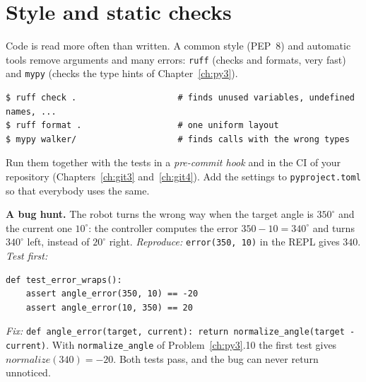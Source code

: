 \section*{Style and static checks}
Code is read more often than written. A common style (PEP~8) and automatic tools remove arguments and many errors: \texttt{ruff} (checks and formats, very fast) and \texttt{mypy} (checks the type hints of Chapter~\ref{ch:py3}).
\begin{verbatim}
$ ruff check .                    # finds unused variables, undefined names, ...
$ ruff format .                   # one uniform layout
$ mypy walker/                    # finds calls with the wrong types
\end{verbatim}
Run them together with the tests in a \emph{pre-commit hook} and in the CI of your repository (Chapters~\ref{ch:git3} and~\ref{ch:git4}). Add the settings to \texttt{pyproject.toml} so that everybody uses the same.

\begin{example}
\textbf{A bug hunt.} The robot turns the wrong way when the target angle is $350^\circ$ and the current one $10^\circ$: the controller computes the error $350-10=340^\circ$ and turns $340^\circ$ left, instead of $20^\circ$ right. \emph{Reproduce:} \texttt{error(350, 10)} in the REPL gives $340$. \emph{Test first:}
\begin{verbatim}
def test_error_wraps():
    assert angle_error(350, 10) == -20
    assert angle_error(10, 350) == 20
\end{verbatim}
\emph{Fix:} \verb!def angle_error(target, current): return normalize_angle(target - current)!. With \texttt{normalize\_angle} of Problem~\ref{ch:py3}.10 the first test gives $normalize(340)=-20$. Both tests pass, and the bug can never return unnoticed.
\end{example}

